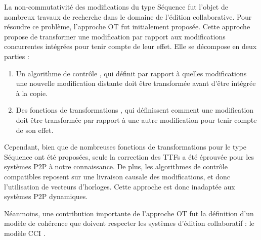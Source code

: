 La non-commutativité des modifications du type Séquence fut l'objet de nombreux travaux de recherche dans le domaine de l'édition collaborative.
Pour résoudre ce problème, l'approche \ac{OT} \cite{1989-grove-ellis-gibbs, 1998-ot-issues-algorithms-achievements-sun} fut initialement proposée.
Cette approche propose de transformer une modification par rapport aux modifications concurrentes intégrées pour tenir compte de leur effet.
Elle se décompose en deux parties :
\begin{enumerate}
  \item Un algorithme de contrôle \cite{1996-adopted-ressel-nitsch-ruhland-gunzenhauser, 1996-reduce-sun-yang-zhang-chen, 2009-cot-sun}, qui définit par rapport à quelles modifications une nouvelle modification distante doit être transformée avant d'être intégrée à la copie.
  \item Des fonctions de transformations \cite{1989-grove-ellis-gibbs,1996-adopted-ressel-nitsch-ruhland-gunzenhauser,1998-got-sun-jia-zhang-yang-chen,2006-tombstone-transformation-functions-oster}, qui définissent comment une modification doit être transformée par rapport à une autre modification pour tenir compte de son effet.
\end{enumerate}

Cependant, bien que de nombreuses fonctions de transformations pour le type Séquence ont été proposées, seule la correction des \acfp{TTF} \cite{2006-tombstone-transformation-functions-oster} a été éprouvée pour les systèmes \ac{P2P} à notre connaissance.
De plus, les algorithmes de contrôle compatibles reposent sur une livraison causale des modifications, et donc l'utilisation de vecteurs d'horloges.
Cette approche est donc inadaptée aux systèmes \ac{P2P} dynamiques.

Néanmoins, une contribution importante de l'approche \ac{OT} fut la définition d'un modèle de cohérence que doivent respecter les systèmes d'édition collaboratif : le modèle \acf{CCI} \cite{1998-cci-sun}.

